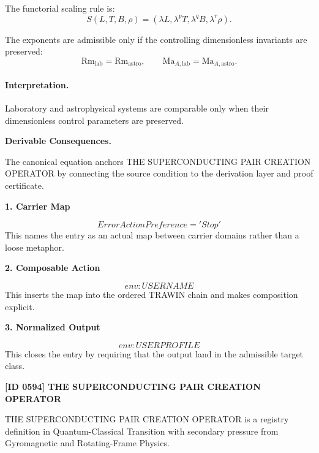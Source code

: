 The functorial scaling rule is:
\begin{equation}
S(L,T,B,\rho)
=
(\lambda L,\lambda^{p}T,\lambda^{q}B,\lambda^{r}\rho).
\end{equation}

The exponents are admissible only if the controlling dimensionless invariants are preserved:
\begin{equation}
\boxed{
\mathrm{Rm}_{\mathrm{lab}}=\mathrm{Rm}_{\mathrm{astro}},
\qquad
\mathrm{Ma}_{A,\mathrm{lab}}=\mathrm{Ma}_{A,\mathrm{astro}}.
}
\end{equation}

\paragraph{Interpretation.}
Laboratory and astrophysical systems are comparable only when their dimensionless control parameters are preserved.

\par\vspace{0.35em}
\noindent\textbf{Derivable Consequences.}\quad
\begingroup
\footnotesize
\raggedright
The canonical equation anchors THE SUPERCONDUCTING PAIR CREATION OPERATOR by connecting the source condition to the derivation layer and proof certificate.
\par\endgroup

\noindent\textbf{1. Carrier Map}\par
\[
ErrorActionPreference = 'Stop'
\]
\noindent This names the entry as an actual map between carrier domains rather than a loose metaphor.\par
\noindent\textbf{2. Composable Action}\par
\[
env:USERNAME
\]
\noindent This inserts the map into the ordered TRAWIN chain and makes composition explicit.\par
\noindent\textbf{3. Normalized Output}\par
\[
env:USERPROFILE
\]
\noindent This closes the entry by requiring that the output land in the admissible target class.\par

\clearpage
\noindent\textbf{[ID 0594] THE SUPERCONDUCTING PAIR CREATION OPERATOR}\par
\vspace{0.35em}
\begingroup\small
{}
THE SUPERCONDUCTING PAIR CREATION OPERATOR is a registry definition in Quantum-Classical Transition with secondary pressure from Gyromagnetic and Rotating-Frame Physics.

